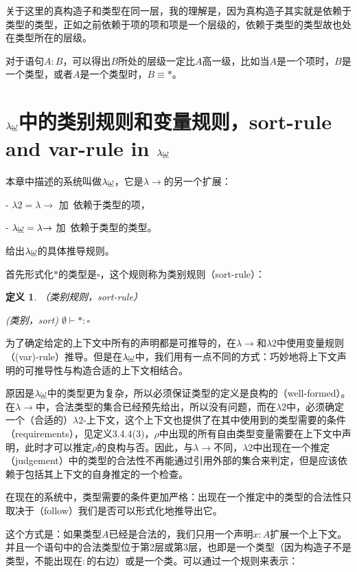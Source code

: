 \documentclass[UTF8]{article}
\newtheorem{thm}{定义}[section]
\begin{document}
		关于这里的真构造子和类型在同一层，我的理解是，因为真构造子其实就是依赖于类型的类型，正如之前依赖于项的项和项是一个层级的，依赖于类型的类型故也处在类型所在的层级。
	
		对于语句$A:B$，可以得出$B$所处的层级一定比$A$高一级，比如当$A$是一个项时，$B$是一个类型，或者$A$是一个类型时，$B\equiv*$。
		
	\section{$\lambda{\uline{\omega}}$中的类别规则和变量规则，sort-rule and var-rule in $\lambda{\uline{\omega}}$}
		\noindent
		本章中描述的系统叫做$\lambda{\uline{\omega}}$，它是$\lambda{\rightarrow}$的另一个扩展：
		
		\noindent
		- $\lambda{2} = \lambda{\rightarrow}$ 加\ 依赖于类型的项，
		
		\noindent
		- $\lambda{\uline{\omega}} = \lambda{\rightarrow}$ 加\ 依赖于类型的类型。
		
		给出$\lambda{\uline{\omega}}$的具体推导规则。
		
		首先形式化$*$的类型是$\square$，这个规则称为类别规则（sort-rule）：
		
		\begin{thm} （类别规则，sort-rule）
			
			(类别，sort) $\emptyset \vdash *:\square$
		\end{thm}
	
		为了确定给定的上下文中所有的声明都是可推导的，在$\lambda{\rightarrow}$和$\lambda{2}$中使用变量规则（(var)-rule）推导。但是在$\lambda{\uline{\omega}}$中，我们用有一点不同的方式：巧妙地将上下文声明的可推导性与构造合适的上下文相结合。
		
		原因是$\lambda{\uline{\omega}}$中的类型更为复杂，所以必须保证类型的定义是良构的（well-formed）。在$\lambda{\rightarrow}$中，合法类型的集合已经预先给出，所以没有问题，而在$\lambda{2}$中，必须确定一个（合适的）$\lambda{2}$-上下文，这个上下文也提供了在其中使用到的类型需要的条件（requirements），见定义3.4.4(3)，$\rho$中出现的所有自由类型变量需要在上下文中声明，此时才可以推定$\rho$的良构与否。因此，与$\lambda{\rightarrow}$不同，$\lambda{2}$中出现在一个推定（judgement）中的类型的合法性不再能通过引用外部的集合来判定，但是应该依赖于包括其上下文的自身推定的一个检查。
		
		在现在的系统中，类型需要的条件更加严格：出现在一个推定中的类型的合法性只取决于（follow）我们是否可以形式化地推导出它。
		
		这个方式是：如果类型$A$已经是合法的，我们只用一个声明$x:A$扩展一个上下文。并且一个语句中的合法类型位于第2层或第3层，也即是一个类型（因为构造子不是类型，不能出现在$:$的右边）或是一个类。可以通过一个规则来表示：
		
\end{document}
